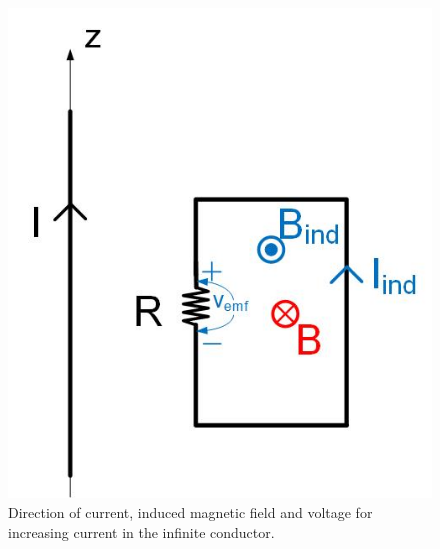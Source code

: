 \documentclass{ximera}
\begin{document}
\begin{example}
\begin{explanation}
\begin{figure}[htbp]
\begin{center}
\includegraphics[scale=0.5]{../jpg/Lenzlaw3.jpg}
\end{center}
\caption{Direction of current, induced magnetic field and voltage for increasing current in the infinite conductor.}
\label{fig:LenzLaw3}
\end{figure}





\end{explanation}

\end{example}
\end{document}
